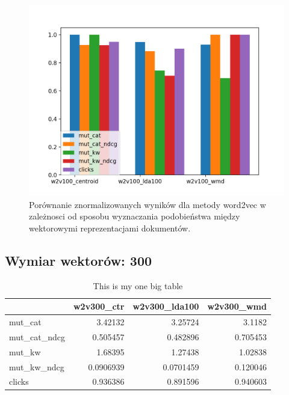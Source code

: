 \documentclass[pl]{minipw} %
\begin{document}
\begin{figure}[H]
	\centering
	\includegraphics[width=1\textwidth]{img/results/w2v100_centroid_w2v100_lda100_w2v100_wmd_.png}
	\caption{Porównanie znormalizowanych wyników dla metody word2vec w zależnosci od sposobu wyznaczania podobieństwa między wektorowymi reprezentacjami dokumentów.}
\end{figure}

\subsection{Wymiar wektorów: 300}


\begin{table}
	\centering
	\begin{tabular}{lrrr}
		\hline
		&   w2v300\_ctr &   w2v300\_lda100 &   w2v300\_wmd \\
		\hline
		mut\_cat      &    3.42132   &       3.25724   &     3.1182   \\
		mut\_cat\_ndcg &    0.505457  &       0.482896  &     0.705453 \\
		mut\_kw       &    1.68395   &       1.27438   &     1.02838  \\
		mut\_kw\_ndcg  &    0.0906939 &       0.0701459 &     0.120046 \\
		clicks       &    0.936386  &       0.891596  &     0.940603 \\
		\hline
	\end{tabular}
	\caption{This is my one big table}
\end{table}
\end{document}
